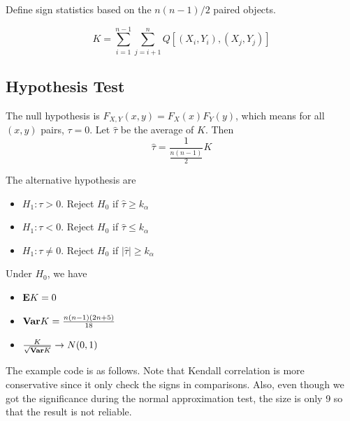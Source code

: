 Define sign statistics based on the $n(n-1)/2$ paired objects.

\[K = \sum_{i=1}^{n-1}\sum_{j=i+1}^{n} Q[(X_i, Y_i), (X_j, Y_j)]\]

\subsection{Hypothesis Test}
The null hypothesis is $F_{X,Y}(x, y) = F_X(x)F_Y(y)$, which means for all $(x, y)$ pairs, $\tau = 0$. Let $\hat{\tau}$ be the average of $K$. Then 
\[\hat{\tau} = \frac{1}{\frac{n(n-1)}{2}}K\]

The alternative hypothesis are
\begin{itemize}
	\item $H_1: \tau > 0$. Reject $H_0$ if $\hat{\tau} \ge k_\alpha$
	\item $H_1: \tau < 0$. Reject $H_0$ if $\hat{\tau} \le k_\alpha$
	\item $H_1: \tau \neq 0$. Reject $H_0$ if $|\hat{\tau} |\ge k_\alpha$
\end{itemize}

Under $H_0$, we have
\begin{itemize}
	\item ${\mathbf E} K = 0$
	\item ${\mathbf{Var}} K = \frac{n(n-1)(2n+5)}{18}$
	\item $\frac{K}{\sqrt{{\mathbf{Var}} K}} \rightarrow N(0,1)$
\end{itemize}

The example code is as follows. Note that Kendall correlation is more conservative since it only check the signs in comparisons. Also, even though we got the significance during the normal approximation test, the size is only 9 so that the result is not reliable.

